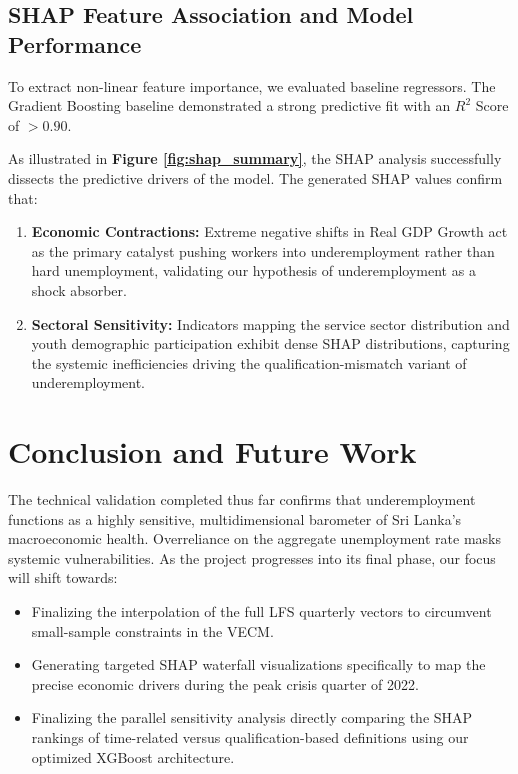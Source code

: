 \documentclass[sigconf]{acmart}
\begin{document}
\subsection{SHAP Feature Association and Model Performance}
To extract non-linear feature importance, we evaluated baseline regressors. The Gradient Boosting baseline demonstrated a strong predictive fit with an $R^2$ Score of $>0.90$.

As illustrated in \textbf{Figure \ref{fig:shap_summary}}, the SHAP analysis successfully dissects the predictive drivers of the model. 
The generated SHAP values confirm that:
\begin{enumerate}
    \item \textbf{Economic Contractions:} Extreme negative shifts in Real GDP Growth act as the primary catalyst pushing workers into underemployment rather than hard unemployment, validating our hypothesis of underemployment as a shock absorber.
    \item \textbf{Sectoral Sensitivity:} Indicators mapping the service sector distribution and youth demographic participation exhibit dense SHAP distributions, capturing the systemic inefficiencies driving the qualification-mismatch variant of underemployment.
\end{enumerate}

\section{Conclusion and Future Work}

The technical validation completed thus far confirms that underemployment functions as a highly sensitive, multidimensional barometer of Sri Lanka's macroeconomic health. Overreliance on the aggregate unemployment rate masks systemic vulnerabilities. 
As the project progresses into its final phase, our focus will shift towards:
\begin{itemize}
    \item Finalizing the interpolation of the full LFS quarterly vectors to circumvent small-sample constraints in the VECM.
    \item Generating targeted SHAP waterfall visualizations specifically to map the precise economic drivers during the peak crisis quarter of 2022.
    \item Finalizing the parallel sensitivity analysis directly comparing the SHAP rankings of time-related versus qualification-based definitions using our optimized XGBoost architecture. 
\end{itemize}



\end{document}
